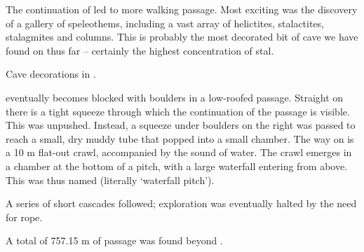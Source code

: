 The continuation of  led to more walking passage. Most
exciting was the discovery of a gallery of speleothems, including a vast
array of helictites, stalactites, stalagmites and columns. This is
probably the most decorated bit of cave we have found on  thus
far -- certainly the highest concentration of stal.

\begin{marginfigure}
\checkoddpage \ifoddpage \forcerectofloat \else \forceversofloat \fi
\centering
 \caption{Cave decorations in . }
 \label{atlantis stal}
\end{marginfigure}


 eventually becomes blocked with boulders in a low-roofed
passage. Straight on there is a tight squeeze through which the
continuation of the passage is visible. This was unpushed. Instead, a
squeeze under boulders on the right was passed to reach a small, dry
muddy tube that popped into a small chamber. The way on is a 10 m
flat-out crawl, accompanied by the sound of water. The crawl emerges in
a chamber at the bottom of a pitch, with a large waterfall entering from
above. This was thus named  (literally `waterfall
pitch').

A series of short cascades followed; exploration was eventually halted
by the need for rope.

A total of 757.15 m of passage was found beyond .

